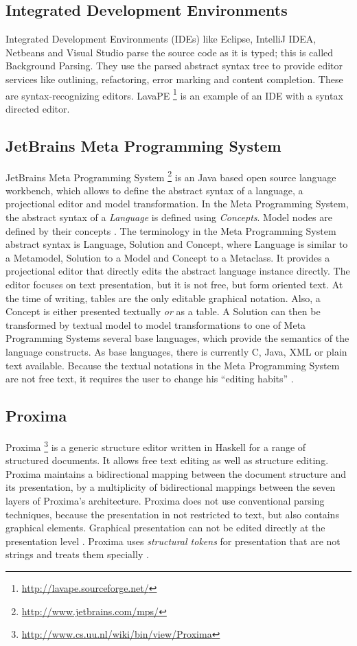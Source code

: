 \subsection{Integrated Development Environments}
Integrated Development Environments (IDEs) like Eclipse, IntelliJ IDEA, Netbeans and Visual Studio parse the source code as it is typed; this is called Background Parsing. They use the parsed abstract syntax tree to provide editor services like outlining, refactoring, error marking and content completion. These are syntax-recognizing editors. LavaPE \footnote{\raggedright \url{http://lavape.sourceforge.net/}} is an example of an IDE with a syntax directed editor.  

\subsection{JetBrains Meta Programming System}
JetBrains Meta Programming System \footnote{\raggedright \url{http://www.jetbrains.com/mps/}} is an Java based open source language workbench, which allows to define the abstract syntax of a language, a projectional editor and model transformation. In the Meta Programming System, the abstract syntax of a \emph{Language} is defined using \emph{Concepts}. Model nodes are defined by their concepts \cite{MPStut}. The terminology in the Meta Programming System abstract syntax is Language, Solution and Concept, where Language is similar to a Metamodel, Solution to a Model and Concept to a Metaclass. It provides a projectional editor that directly edits the abstract language instance directly. The editor focuses on text presentation, but it is not free, but form oriented text. At the time of writing, tables are the only editable graphical notation. Also, a Concept is either presented textually \emph{or} as a table. A Solution can then be transformed by textual model to model transformations to one of  Meta Programming Systems several base languages, which provide the semantics of the language constructs. As base languages, there is currently C, Java, XML or plain text available. Because the textual notations in the Meta Programming System are not free text, it requires the user to change his ``editing habits'' \cite{VolterMPS}. 

\subsection{Proxima} 
Proxima \footnote{\raggedright \url{http://www.cs.uu.nl/wiki/bin/view/Proxima}} is a generic structure editor written in Haskell for a range of structured documents. It allows free text editing as well as structure editing. Proxima maintains a bidirectional mapping between the document structure and its presentation, by a multiplicity of bidirectional mappings between the seven layers of Proxima's architecture. Proxima does not use conventional parsing techniques, because the presentation in not restricted to text, but also contains graphical elements. Graphical presentation can not be edited directly at the presentation level \cite{beyond_ascii}. Proxima uses \emph{structural tokens} for presentation that are not strings and treats them specially \cite{proxima}.

